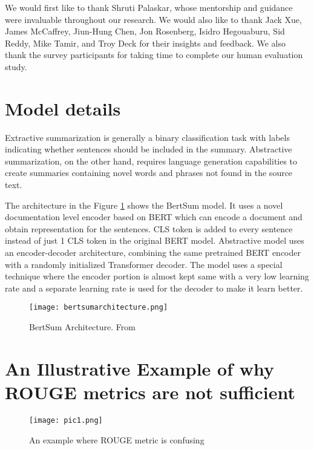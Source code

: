 \documentclass[sigconf]{acmart}
\begin{document}
\begin{acks}
We would first like to thank Shruti Palaskar, whose mentorship and guidance were invaluable throughout our research. We would also like to thank Jack Xue, James McCaffrey, Jiun-Hung Chen, Jon Rosenberg, Isidro Hegouaburu, Sid Reddy, Mike Tamir, and Troy Deck for their insights and feedback. We also thank the survey participants for taking time to complete our human evaluation study. 
\end{acks}





\appendix

\section{Model details}
Extractive summarization is generally a binary classification task with labels indicating whether sentences should be included in the summary. Abstractive summarization, on the other hand, requires language generation capabilities to create summaries containing novel words and phrases not found in the source text. 

The architecture in the Figure \ref{fig:architecure} shows the BertSum model. It uses a novel documentation level encoder based on BERT which can encode a document and obtain representation for the sentences. CLS token is added to every sentence instead of just 1 CLS token in the original BERT model. Abstractive model uses an encoder-decoder architecture, combining the same pretrained BERT encoder with a randomly initialized Transformer decoder. The model uses a special technique where the encoder portion is almost kept same with a very low learning rate and a separate learning rate is used for the decoder to make it learn better. 

\begin{figure}
  \centering
  \texttt{[image: bertsumarchitecture.png]}
  \caption{BertSum Architecture. From \cite{liu-lapata-2019-text} }
  \label{fig:architecure}
\end{figure}

\section{An Illustrative Example of why ROUGE metrics are not sufficient}

\begin{figure}[H]
  \texttt{[image: pic1.png]}
  \caption{An example where ROUGE metric is confusing}
  \label{fig:funnysummary}
\end{figure}
\end{document}
